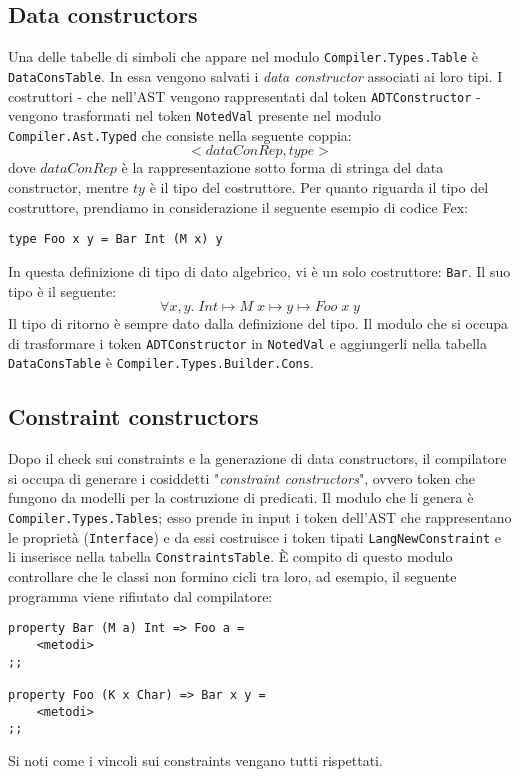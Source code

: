 \documentclass[10pt,a4paper]{article}
\begin{document}
\subsection{Data constructors}
Una delle tabelle di simboli che appare nel modulo \texttt{Compiler.Types.Table} è \texttt{DataConsTable}. In essa
vengono salvati i \textit{data constructor} associati ai loro tipi. I costruttori - che nell'AST vengono rappresentati
dal token \texttt{ADTConstructor} - vengono trasformati nel token \texttt{NotedVal} presente nel modulo
\texttt{Compiler.Ast.Typed} che consiste nella seguente coppia:
\[ < dataConRep, type > \]
dove $ dataConRep $ è la rappresentazione sotto forma di stringa del data constructor, mentre $ ty $ è il tipo del
costruttore. Per quanto riguarda il tipo del costruttore, prendiamo in considerazione il seguente esempio di codice
Fex:
\begin{lstlisting}
type Foo x y = Bar Int (M x) y
\end{lstlisting}
In questa definizione di tipo di dato algebrico, vi è un solo costruttore: \texttt{Bar}. Il suo tipo è il seguente:
\[ \forall x, y. \; Int \mapsto M \; x \mapsto y \mapsto Foo \; x \; y \]
Il tipo di ritorno è sempre dato dalla definizione del tipo. Il modulo che si occupa di trasformare i token
\texttt{ADTConstructor} in \texttt{NotedVal} e aggiungerli nella tabella \texttt{DataConsTable} è
\texttt{Compiler.Types.Builder.Cons}.

\subsection{Constraint constructors}
Dopo il check sui constraints e la generazione di data constructors, il compilatore si occupa di generare i cosiddetti
"\textit{constraint constructors}", ovvero token che fungono da modelli per la costruzione di predicati. Il modulo
che li genera è \texttt{Compiler.Types.Tables}; esso prende in input i token dell'AST che rappresentano le proprietà
(\texttt{Interface}) e da essi costruisce i token tipati \texttt{LangNewConstraint} e li inserisce nella tabella
\texttt{ConstraintsTable}. \`E compito di questo modulo controllare che le classi non formino cicli tra loro, ad
esempio, il seguente programma viene rifiutato dal compilatore:
\begin{lstlisting}
property Bar (M a) Int => Foo a =
    <metodi>
;;

property Foo (K x Char) => Bar x y =
    <metodi>
;;
\end{lstlisting}
Si noti come i vincoli sui constraints vengano tutti rispettati.
\end{document}
